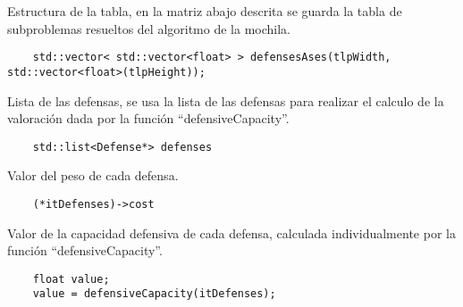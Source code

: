 Estructura de la tabla, en la matriz abajo descrita se guarda la tabla de subproblemas resueltos del algoritmo de la mochila.
\begin{lstlisting}
	std::vector< std::vector<float> > defensesAses(tlpWidth, std::vector<float>(tlpHeight));
\end{lstlisting}

Lista de las defensas, se usa la lista de las defensas para realizar el calculo de la valoración dada por la función ``defensiveCapacity''.
\begin{lstlisting}
	std::list<Defense*> defenses
\end{lstlisting}

Valor del peso de cada defensa.
\begin{lstlisting}
	(*itDefenses)->cost
\end{lstlisting}

Valor de la capacidad defensiva de cada defensa, calculada individualmente por la función ``defensiveCapacity''.
\begin{lstlisting}
	float value;
	value = defensiveCapacity(itDefenses);
\end{lstlisting}
